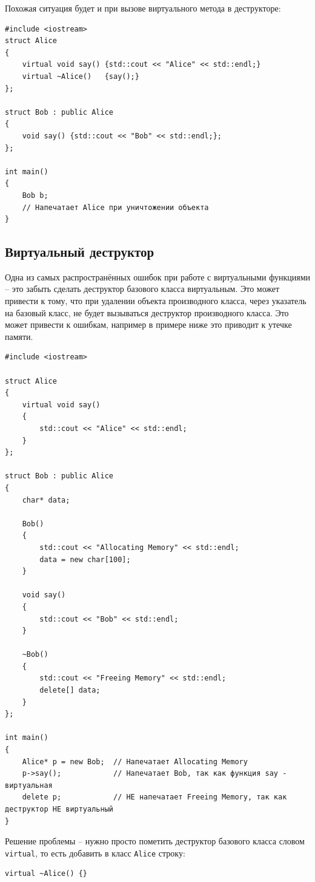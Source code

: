 \documentclass{article}
\begin{document}
\noindent Похожая ситуация будет и при вызове виртуального метода в деструкторе:
\begin{lstlisting}[style=csMiptCppBorderStyle]
#include <iostream>
struct Alice 
{
    virtual void say() {std::cout << "Alice" << std::endl;}
    virtual ~Alice()   {say();}
};

struct Bob : public Alice 
{
    void say() {std::cout << "Bob" << std::endl;};
};

int main() 
{
    Bob b;
    // Напечатает Alice при уничтожении объекта
}
\end{lstlisting}



\subsection*{Виртуальный деструктор}
Одна из самых распространённых ошибок при работе с виртуальными функциями -- это забыть сделать деструктор базового класса виртуальным. Это может привести к тому, что при удалении объекта производного класса, через указатель на базовый класс, не будет вызываться деструктор производного класса. Это может привести к ошибкам, например в примере ниже это приводит к утечке памяти.

\begin{lstlisting}[style=csMiptCppBorderStyle]
#include <iostream>

struct Alice 
{
    virtual void say() 
    {
    	std::cout << "Alice" << std::endl;
    }
};

struct Bob : public Alice 
{
	char* data;
	
	Bob()
	{
		std::cout << "Allocating Memory" << std::endl;
		data = new char[100];		
	}
	
    void say() 
    {
    	std::cout << "Bob" << std::endl;
    }
    
    ~Bob()
    {
    	std::cout << "Freeing Memory" << std::endl;
    	delete[] data;
    }
};

int main() 
{
	Alice* p = new Bob;  // Напечатает Allocating Memory
    p->say();            // Напечатает Bob, так как функция say - виртуальная
    delete p;            // НЕ напечатает Freeing Memory, так как деструктор НЕ виртуальный
}
\end{lstlisting}

\noindent Решение проблемы -- нужно просто пометить деструктор базового класса словом \texttt{virtual}, то есть добавить в класс \texttt{Alice} строку:
\begin{lstlisting}[style=csMiptCppStyle]
virtual ~Alice() {}
\end{lstlisting}
\end{document}

